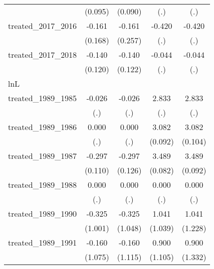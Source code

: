 {\begin{tabular}{l*{4}{c}}
            &     (0.095)         &     (0.090)         &         (.)         &         (.)         \\
[1em]
treated\_2017\_2016&      -0.161         &      -0.161         &      -0.420         &      -0.420         \\
            &     (0.168)         &     (0.257)         &         (.)         &         (.)         \\
[1em]
treated\_2017\_2018&      -0.140         &      -0.140         &      -0.044         &      -0.044         \\
            &     (0.120)         &     (0.122)         &         (.)         &         (.)         \\
\hline
lnL         &                     &                     &                     &                     \\
treated\_1989\_1985&      -0.026         &      -0.026         &       2.833         &       2.833         \\
            &         (.)         &         (.)         &         (.)         &         (.)         \\
[1em]
treated\_1989\_1986&       0.000         &       0.000         &       3.082\sym{***}&       3.082\sym{***}\\
            &         (.)         &         (.)         &     (0.092)         &     (0.104)         \\
[1em]
treated\_1989\_1987&      -0.297\sym{**} &      -0.297\sym{*}  &       3.489\sym{***}&       3.489\sym{***}\\
            &     (0.110)         &     (0.126)         &     (0.082)         &     (0.092)         \\
[1em]
treated\_1989\_1988&       0.000         &       0.000         &       0.000         &       0.000         \\
            &         (.)         &         (.)         &         (.)         &         (.)         \\
[1em]
treated\_1989\_1990&      -0.325         &      -0.325         &       1.041         &       1.041         \\
            &     (1.001)         &     (1.048)         &     (1.039)         &     (1.228)         \\
[1em]
treated\_1989\_1991&      -0.160         &      -0.160         &       0.900         &       0.900         \\
            &     (1.075)         &     (1.115)         &     (1.105)         &     (1.332)         \\

\end{tabular}}
